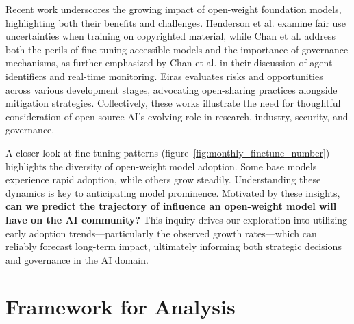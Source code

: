 \documentclass{article} %
\begin{document}
        Recent work underscores the growing impact of open-weight foundation models, highlighting both their benefits and challenges. Henderson et al. \cite{hendersonFoundationModelsFair2023} examine fair use uncertainties when training on copyrighted material, while Chan et al. \cite{chanHazardsIncreasinglyAccessible2023} address both the perils of fine-tuning accessible models and the importance of governance mechanisms, as further emphasized by Chan et al. \cite{chanVisibilityAIAgents2024} in their discussion of agent identifiers and real-time monitoring. Eiras \cite{eirasRisksOpportunitiesOpenSource2024} evaluates risks and opportunities across various development stages, advocating open-sharing practices alongside mitigation strategies. Collectively, these works illustrate the need for thoughtful consideration of open-source AI’s evolving role in research, industry, security, and governance. 
       
       A closer look at fine-tuning patterns (figure~\ref{fig:monthly_finetune_number}) highlights the diversity of open-weight model adoption. Some base models experience rapid adoption, while others grow steadily. Understanding these dynamics is key to anticipating model prominence. Motivated by these insights, \textbf{can we predict the trajectory of influence an open-weight model will have on the AI community?} This inquiry drives our exploration into utilizing early adoption trends—particularly the observed growth rates—which can reliably forecast long-term impact, ultimately informing both strategic decisions and governance in the AI domain.

    \section{Framework for Analysis} \label{sec:framework}
     
\end{document}
